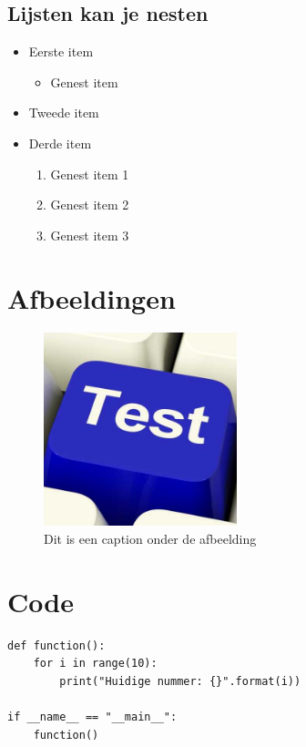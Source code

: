 \documentclass{article}
\begin{document}
\subsection{Lijsten kan je nesten}

\begin{itemize}
    \item Eerste item
    \begin{itemize}
        \item Genest item
    \end{itemize}
    \item Tweede item
    \item Derde item
    \begin{enumerate}
        \item Genest item 1
        \item Genest item 2
        \item Genest item 3
    \end{enumerate}
\end{itemize}

\section{Afbeeldingen}

\begin{figure}[H] %
    \centering %
    \includegraphics[width=0.5\textwidth]{images/test.jpg}
    \caption{Dit is een caption onder de afbeelding}
\end{figure}

\section{Code}

\begin{verbatim}
def function():
    for i in range(10):
        print("Huidige nummer: {}".format(i))

if __name__ == "__main__":
    function()
\end{verbatim}
\end{document}
